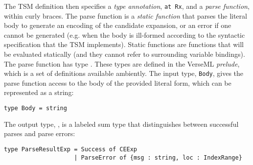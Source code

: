 The TSM definition then specifies a \emph{type annotation}, \lstinline{at Rx}, and a \emph{parse function}, within curly braces. 
The {parse function} is a \emph{static function} that parses the literal body to generate an encoding of the candidate expansion, or an error if one cannot be generated (e.g. when the body is ill-formed according to the syntactic specification that the TSM implements).  Static functions are functions that will be evaluated statically (and they cannot refer to surrounding variable bindings). The parse function has type . These types are defined in the VerseML \emph{prelude}, which is a set of definitions available ambiently. The input type, \lstinline{Body}, gives the parse function access to the {body} of the provided literal form, which can be represented as a string:
\begin{lstlisting}[numbers=none]
type Body = string
\end{lstlisting} 

The output type, , is a labeled sum type that distinguishes between successful parses and parse errors:
\begin{lstlisting}[numbers=none]
type ParseResultExp = Success of CEExp 
                    | ParseError of {msg : string, loc : IndexRange}
\end{lstlisting}

